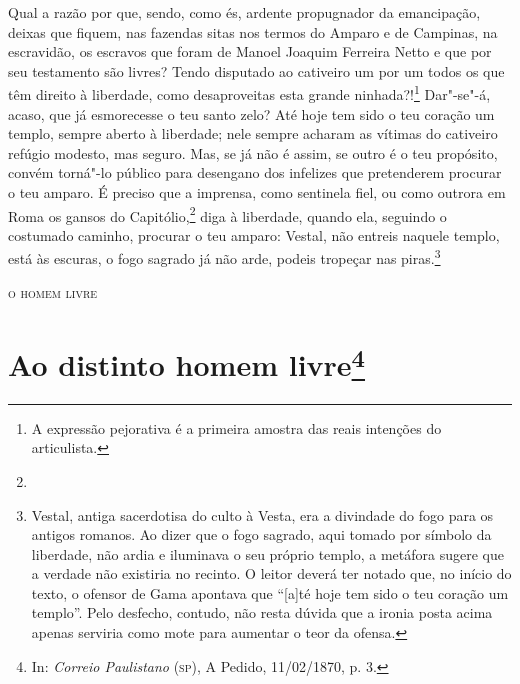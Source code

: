 Qual a razão por que, sendo, como és, ardente propugnador da
emancipação, deixas que fiquem, nas fazendas sitas nos termos do
Amparo e de
Campinas, na escravidão, os escravos que foram de Manoel Joaquim
Ferreira Netto e que por seu testamento são livres? Tendo disputado ao
cativeiro um por um todos os que têm direito à liberdade, como
desaproveitas esta grande ninhada?!\footnote{A expressão pejorativa é
  a primeira amostra das reais intenções do articulista.} Dar"-se"-á,
acaso, que já esmorecesse o teu santo zelo? Até hoje tem sido o teu
coração um templo, sempre aberto à liberdade; nele sempre acharam as
vítimas do cativeiro refúgio modesto, mas seguro. Mas, se já não é
assim, se outro é o teu propósito, convém torná"-lo público para
desengano dos infelizes que pretenderem procurar o teu amparo. É preciso
que a imprensa, como sentinela fiel, ou como outrora em Roma os gansos
do Capitólio,\footnote{} diga à liberdade,
quando ela, seguindo o costumado caminho, procurar o teu amparo: Vestal,
não entreis naquele templo, está às escuras, o fogo sagrado já não arde,
podeis tropeçar nas piras.\footnote{Vestal, antiga sacerdotisa do
  culto à Vesta, era a divindade do fogo para os antigos romanos. Ao
  dizer que o fogo sagrado, aqui tomado por símbolo da liberdade, não
  ardia e iluminava o seu próprio templo, a metáfora sugere que a
  verdade não existiria no recinto. O leitor deverá ter notado que, no
  início do texto, o ofensor de Gama apontava que ``{[}a{]}té hoje tem
  sido o teu coração um templo''. Pelo desfecho, contudo, não resta
  dúvida que a ironia posta acima apenas serviria como mote para
  aumentar o teor da ofensa.}

\hfill\textsc{o homem livre}



\chapter{Ao distinto homem livre\footnote[*]{In: \emph{Correio
  Paulistano} (\textsc{sp}), A Pedido, 11/02/1870, p. 3.}} %

